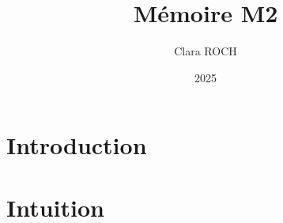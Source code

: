 \documentclass[10pt,twoside]{report}
\title{Mémoire M2}
\author{Clara ROCH}
\date{2025}
\begin{document}
\maketitle
\tableofcontents

\chapter{Introduction}





\chapter{Intuition}


\appendix 

\end{document}
